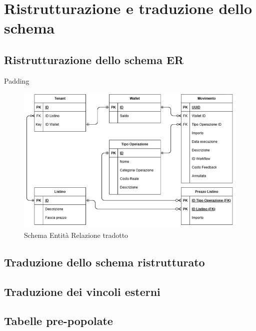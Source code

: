 \chapter{Ristrutturazione e traduzione dello schema}
\section{Ristrutturazione dello schema ER}
Padding

\begin{figure}[H]
  \centering
  \includegraphics[width=13cm]{images/er-diagram-old.jpg}
  \caption{Schema Entit\`a Relazione tradotto}
\end{figure}

\section{Traduzione dello schema ristrutturato}

\section{Traduzione dei vincoli esterni}

\section {Tabelle pre-popolate}

